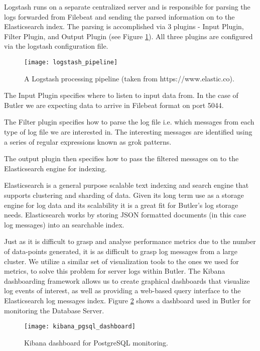 Logstash runs on a separate centralized server and is responsible for parsing the logs forwarded from Filebeat and sending the parsed information on to the Elasticsearch index. The parsing is accomplished via 3 plugins - Input Plugin, Filter Plugin, and Output Plugin (see Figure \ref{fig:logstash_pipeline}). All three plugins are configured via the logstash configuration file.

\begin{figure}[h]
\texttt{[image: logstash\_pipeline]}
\centering
\caption {A Logstash processing pipeline (taken from https://www.elastic.co).}
\label{fig:logstash_pipeline}
\end{figure}

The Input Plugin specifies where to listen to input data from. In the case of Butler we are expecting data to arrive in Filebeat format on port 5044.

The Filter plugin specifies how to parse the log file i.e. which messages from each type of log file we are interested in. The interesting messages are identified using a series of regular expressions known as grok patterns. 

The output plugin then specifies how to pass the filtered messages on to the Elasticsearch engine for indexing.

Elasticsearch is a general purpose scalable text indexing and search engine that supports clustering and sharding of data. Given its long term use as a storage engine for log data and its scalability it is a great fit for Butler's log storage needs. Elasticsearch works by storing JSON formatted documents (in this case log messages) into an searchable index. 

Just as it is difficult to grasp and analyse performance metrics due to the number of data-points generated, it is as difficult to grasp log messages from a large cluster. We utilize a similar set of visualization tools to the ones we used for metrics, to solve this problem for server logs within Butler. The Kibana dashboarding framework allows us to create graphical dashboards that visualize log events of interest, as well as providing a web-based query interface to the Elasticsearch log messages index. Figure \ref{fig:kibana_pgsql_dashboard} shows a dashboard used in Butler for monitoring the Database Server.

\begin{figure}[h]
\texttt{[image: kibana\_pgsql\_dashboard]}
\centering
\caption {Kibana dashboard for PostgreSQL monitoring.}
\label{fig:kibana_pgsql_dashboard}
\end{figure}
 

